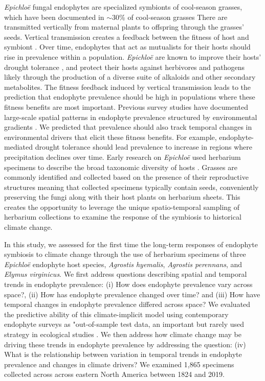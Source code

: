 \documentclass[11pt]{article}
\begin{document}
\emph{Epichloë} fungal endophytes are specialized symbionts of cool-season grasses, which have been documented in $\sim 30$\% of cool-season grasses \citep{leuchtmann1992systematics}
There are transmitted vertically from maternal plants to offspring through the grasses' seeds.
Vertical transmission creates a feedback between the fitness of host and symbiont \citep{fine1975vectors, douglas1998host, rudgers2009fungus}. 
Over time, endophytes that act as mutualists for their hosts should rise in prevalence within a population. 
\emph{Epichloë} are known to improve their hosts' drought tolerance \cite{decunta2021systematic}, and protect their hosts against herbivores \cite{crawford2010fungal} and pathogens \cite{xia2018role} likely through the production of a diverse suite of alkaloids and other secondary metabolites.
The fitness feedback induced by vertical transmission leads to the prediction that endophyte prevalence should be high in populations where these fitness benefits are most important. 
Previous survey studies have documented large-scale spatial patterns in  endophyte prevalence structured by environmental gradients \citep{granath2007variation,bazely2007broad, afkhami2012fungal,sneck2017variation}.
We predicted that prevalence should also track temporal changes in environmental drivers that elicit these fitness benefits.
For example, endophyte-mediated drought tolerance should lead prevalence to increase in regions where precipitation declines over time.
Early research on \emph{Epichloë} used herbarium specimens to describe the broad taxonomic diversity of hosts \citep{white1985endophyte}. 
Grasses are commonly identified and collected based on the presence of their reproductive structures meaning that collected specimens typically contain seeds, conveniently preserving the fungi along with their host plants on herbarium sheets. 
This creates the opportunity to leverage the unique spatio-temporal sampling of herbarium collections to examine the response of the symbiosis to historical climate change.

In this study, we assessed for the first time the long-term responses of endophyte symbiosis to climate change through the use of herbarium specimens of three \emph{Epichloë} endophyte host species, \emph{Agrostis hyemalis}, \emph{Agrostis perennans}, and \emph{Elymus virginicus}.
We first address questions describing spatial and temporal trends in endophyte prevalence: (i) How does endophyte prevalence vary across space?, (ii) How has endophyte prevalence changed over time? and (iii) How have temporal changes in endophyte prevalence differed across space?
We evaluated the predictive ability of this climate-implicit model using contemporary endophyte surveys as "out-of-sample test data, an important but rarely used strategy in ecological studies \cite{tredennick2021practical}. 
We then address how climate change may be driving these trends in endophyte prevalence by addressing the question: (iv) What is the relationship between variation in temporal trends in endophyte prevalence and changes in climate drivers?
We examined 1,865 specimens collected across across eastern North America between 1824 and 2019.
	
\end{document}
